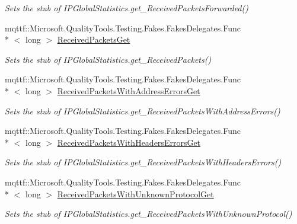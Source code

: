 \begin{DoxyCompactItemize}
\begin{DoxyCompactList}\small\item\em Sets the stub of I\-P\-Global\-Statistics.\-get\-\_\-\-Received\-Packets\-Forwarded()\end{DoxyCompactList}\item 
mqttf\-::\-Microsoft.\-Quality\-Tools.\-Testing.\-Fakes.\-Fakes\-Delegates.\-Func\\*
$<$ long $>$ \hyperlink{class_system_1_1_net_1_1_network_information_1_1_fakes_1_1_stub_i_p_global_statistics_a37cd031138f183d7a0bbca4f55221652}{Received\-Packets\-Get}
\begin{DoxyCompactList}\small\item\em Sets the stub of I\-P\-Global\-Statistics.\-get\-\_\-\-Received\-Packets()\end{DoxyCompactList}\item 
mqttf\-::\-Microsoft.\-Quality\-Tools.\-Testing.\-Fakes.\-Fakes\-Delegates.\-Func\\*
$<$ long $>$ \hyperlink{class_system_1_1_net_1_1_network_information_1_1_fakes_1_1_stub_i_p_global_statistics_a74c2308ffcac2fad1a15d3a343c2d559}{Received\-Packets\-With\-Address\-Errors\-Get}
\begin{DoxyCompactList}\small\item\em Sets the stub of I\-P\-Global\-Statistics.\-get\-\_\-\-Received\-Packets\-With\-Address\-Errors()\end{DoxyCompactList}\item 
mqttf\-::\-Microsoft.\-Quality\-Tools.\-Testing.\-Fakes.\-Fakes\-Delegates.\-Func\\*
$<$ long $>$ \hyperlink{class_system_1_1_net_1_1_network_information_1_1_fakes_1_1_stub_i_p_global_statistics_a4ed5e82c0c4e6ea77d9cce1b5f48a69a}{Received\-Packets\-With\-Headers\-Errors\-Get}
\begin{DoxyCompactList}\small\item\em Sets the stub of I\-P\-Global\-Statistics.\-get\-\_\-\-Received\-Packets\-With\-Headers\-Errors()\end{DoxyCompactList}\item 
mqttf\-::\-Microsoft.\-Quality\-Tools.\-Testing.\-Fakes.\-Fakes\-Delegates.\-Func\\*
$<$ long $>$ \hyperlink{class_system_1_1_net_1_1_network_information_1_1_fakes_1_1_stub_i_p_global_statistics_ac29cb7760e2d9e388167438ca472de29}{Received\-Packets\-With\-Unknown\-Protocol\-Get}
\begin{DoxyCompactList}\small\item\em Sets the stub of I\-P\-Global\-Statistics.\-get\-\_\-\-Received\-Packets\-With\-Unknown\-Protocol()\end{DoxyCompactList}\end{DoxyCompactItemize}
